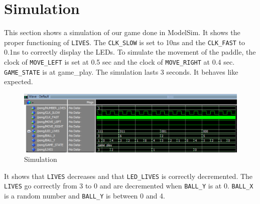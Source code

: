 \section{Simulation}
This section shows a simulation of our game done in ModelSim. It shows the proper functioning of \texttt{LIVES}. The \texttt{CLK\_SLOW} is set to 10ns and the \texttt{CLK\_FAST} to 0.1ns to correctly display the LEDs. To simulate the movement of the paddle, the clock of \texttt{MOVE\_LEFT} is set at 0.5 sec and the clock of \texttt{MOVE\_RIGHT} at 0.4 sec. \texttt{GAME\_STATE} is at game\_play. The simulation lasts 3 seconds. It behaves like expected. \\

\begin{figure}[H]
    \centering
    \includegraphics[scale = 0.3]{Ressources/png/simu.png}
    \caption{Simulation}
    \label{fig_2}
\end{figure}

It shows that \texttt{LIVES} decreases and that \texttt{LED\_LIVES} is correctly decremented. The \texttt{LIVES} go correctly from 3 to 0 and are decremented when \texttt{BALL\_Y} is at 0. \texttt{BALL\_X} is a random number and \texttt{BALL\_Y} is between 0 and 4. 